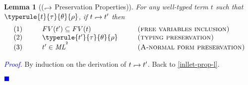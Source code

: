 \documentclass[a4paper,11pt,oneside]{article}
\theoremstyle{plain}
\newtheorem{lemma}[definition]{Lemma}
\renewenvironment{proof}{\noindent \textcolor{blue}{\textit{Proof.}}}
{{\begin{tiny}\textcolor{blue}{$\blacksquare$}\end{tiny}}\\}
\newcommand{\tmlet}[3]{let~#1=#2~in~#3}
\newcommand{\tmsbst}[3]{#1 [#2 \mapsfrom #3] }
\newcommand{\bth}{\bot_\theta}
\newcommand{\brh}{\bot_\rho}
\newcommand{\inlsrc}{\textit{ML}^{^2}}
\newcommand{\inlT}{\inlsrc}
\newcommand{\hookdownarrow}{\mathrel{\rotatebox[origin=c]{180}{$\hookleftarrow$}}}
\newcommand{\inlletarr}{\hookdownarrow}
\newcommand{\inllet}[2]{#1 \hookdownarrow #2}
\begin{document}
\begin{lemma}[($\inlletarr$ Preservation Properties)]
For any well-typed term $t$ such that\\ $\typerule{t}{\tau}{\theta}{\rho}$, if $\inllet{t}{t'}$ then
\begin{displaymath}
\begin{array}{l@{\hspace*{1cm}}l@{\hspace*{1cm}}l}
	(1)& FV(t') \subseteq FV(t) & \textsc{(free variables inclusion)} \\
	(2)& \typerule{t'}{\tau}{\theta}{\rho} &\textsc{(typing preservation)} \\
	(3)& t' \in \inlT & \textsc{(A-normal form preservation)}
\end{array}
\end{displaymath}
 \label{inllet-prop-p}
\end{lemma}

\begin{proof}
 By induction on the derivation of $\inllet{t}{t'}$.
 \label{TODO-inllet-prop-p}
 Back to \ref{inllet-prop-l}.
 \end{proof}	
	
%
%	
%
%	
%
	
\end{document}
